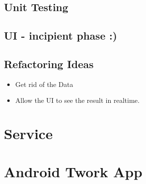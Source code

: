 \documentclass[a4paper,10pt]{article}
\begin{document}
\subsection{Unit Testing}

\subsection{UI - incipient phase :)}

\subsection{Refactoring Ideas}

\begin{itemize}
 \item Get rid of the Data
 \item Allow the UI to see the result in realtime.
\end{itemize}

\section{Service}

\section{Android Twork App}
\end{document}
